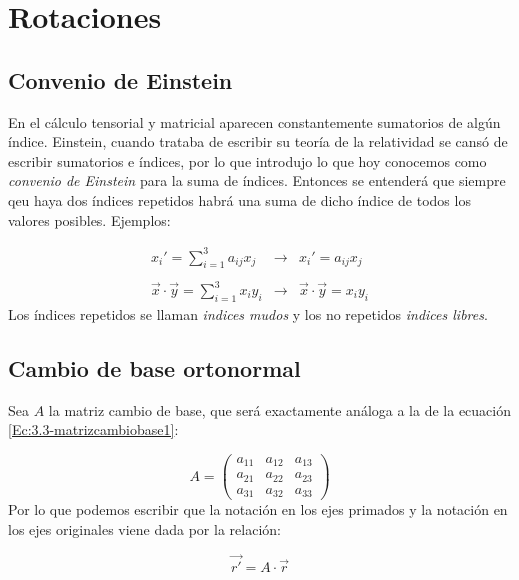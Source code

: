 \documentclass[12pt,a4paper]{book}
\begin{document}
\section{Rotaciones}

\subsection{Convenio de Einstein}
En el cálculo tensorial y matricial aparecen constantemente sumatorios de algún índice. Einstein, cuando trataba de escribir su teoría de la relatividad se cansó de escribir sumatorios e índices, por lo que introdujo lo que hoy conocemos como \textit{convenio de Einstein} para la suma de índices. Entonces se entenderá que siempre qeu haya dos índices repetidos habrá una suma de dicho índice de todos los valores posibles. Ejemplos:

$$
\begin{array}{lll}
x_i' = \sum_{i=1}^3 a_{ij} x_j
 & \longrightarrow  & x_i' = a_{ij} x_j  \\ \\
 
 \vec{x} \cdot \vec{y} = \sum_{i=1}^3 x_i y_i & \longrightarrow & \vec{x} \cdot \vec{y} = x_i y_i
\end{array} 
$$
Los índices repetidos se llaman \textit{indices mudos} y los no repetidos \textit{indices libres}.

\subsection{Cambio de base ortonormal}
 Sea $A$ la matriz cambio de base, que será exactamente análoga a la de la ecuación \ref{Ec:3.3-matrizcambiobase1}:

\begin{equation}
A = \begin{pmatrix}
a_{1 1 } &
a_{1 2 } &
a_{1 3 } \\ 
a_{2 1 } &
a_{2 2 } &
a_{2 3 } \\ 
a_{3 1 } &
a_{3 2 } &
a_{3 3 } 
\end{pmatrix}
\end{equation} 
 Por lo que podemos escribir que la notación en los ejes primados y la notación en los ejes originales viene dada por la relación:
 
\begin{equation}
\vec{r'} =  A  \cdot \vec{r}
\end{equation}
\end{document}
